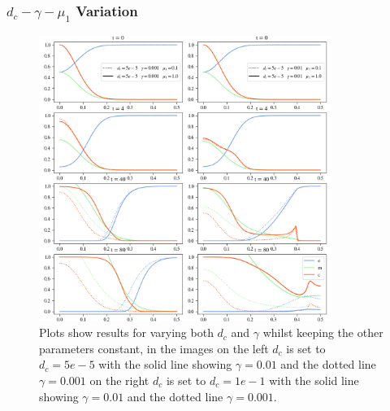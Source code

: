 \subsubsection*{$d_c - \gamma - \mu_1$ Variation}
\begin{figure}[h]
    \centering
    \includegraphics[width=0.85\textwidth]{resources/images/prolif_dc_gamma_mu1_1.png}
    \caption{Plots show results for varying both $d_c$ and $\gamma$ whilst keeping the other parameters constant, in the images on the left $d_c$ is set to $d_c=5e-5$ with the solid line showing $\gamma = 0.01$ and the dotted line $\gamma=0.001$ on the right $d_c$ is set to $d_c=1e-1$ with the solid line showing $\gamma = 0.01$ and the dotted line $\gamma=0.001$.}
    \label{fig:dc_gamma_variation}
\end{figure}

